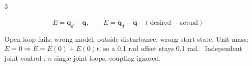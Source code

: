 \begin{multicols}{3}
\begin{fbx}
\[E=\mathbf q_d-\mathbf q,\qquad \dot E=\dot{\mathbf q}_d-\dot{\mathbf q}\quad(\text{desired}-\text{actual})\]
\end{fbx}
Open loop fails: wrong model, outside disturbance, wrong start state. Unit mass: $\ddot E=0\Rightarrow E=E(0)+\dot E(0)t$, so a 0.1 rad offset stays 0.1 rad. \chk\ Independent joint control : $n$ single-joint loops, coupling ignored.


\end{multicols}
